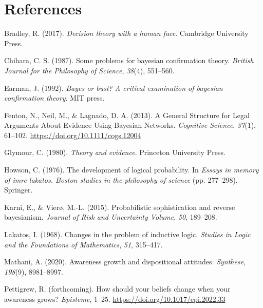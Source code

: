 \documentclass[
  11pt,
  dvipsnames,enabledeprecatedfontcommands]{scrartcl}
\newlength{\cslhangindent}
\newlength{\cslentryspacingunit} %
\newenvironment{CSLReferences}[2] %
 {%
  \setlength{\parindent}{0pt}
  \ifodd #1
  \let\oldpar\par
  \def\par{\hangindent=\cslhangindent\oldpar}
  \fi
  \setlength{\parskip}{#2\cslentryspacingunit}
 }%
 {}
\begin{document}
\singlespace

\hypertarget{references}{%
\section*{References}\label{references}}

\hypertarget{refs}{}
\begin{CSLReferences}{1}{0}
\leavevmode{}%
Bradley, R. (2017). \emph{Decision theory with a human face}. Cambridge
University Press.

\leavevmode{}%
Chihara, C. S. (1987). Some problems for bayesian confirmation theory.
\emph{British Journal for the Philosophy of Science}, \emph{38}(4),
551--560.

\leavevmode{}%
Earman, J. (1992). \emph{Bayes or bust? A critical examination of
bayesian confirmation theory}. MIT press.

\leavevmode{}%
Fenton, N., Neil, M., \& Lagnado, D. A. (2013). A {General Structure}
for {Legal Arguments About Evidence Using Bayesian Networks}.
\emph{Cognitive Science}, \emph{37}(1), 61--102.
\url{https://doi.org/10.1111/cogs.12004}

\leavevmode{}%
Glymour, C. (1980). \emph{Theory and evidence}. Princeton University
Press.

\leavevmode{}%
Howson, C. (1976). The development of logical probability. In
\emph{Essays in memory of imre lakatos. Boston studies in the philosophy
of science} (pp. 277--298). Springer.

\leavevmode{}%
Karni, E., \& Vierø, M.-L. (2015). Probabilistic sophistication and
reverse bayesianism. \emph{Journal of Risk and Uncertainty Volume},
\emph{50}, 189--208.

\leavevmode{}%
Lakatos, I. (1968). Changes in the problem of inductive logic.
\emph{Studies in Logic and the Foundations of Mathematics}, \emph{51},
315--417.

\leavevmode{}%
Mathani, A. (2020). Awareness growth and dispositional attitudes.
\emph{Synthese}, \emph{198}(9), 8981--8997.

\leavevmode{}%
Pettigrew, R. (forthcoming). How should your beliefs change when your
awareness grows? \emph{Episteme}, 1--25.
\url{https://doi.org/10.1017/epi.2022.33}


\end{CSLReferences}
\end{document}
